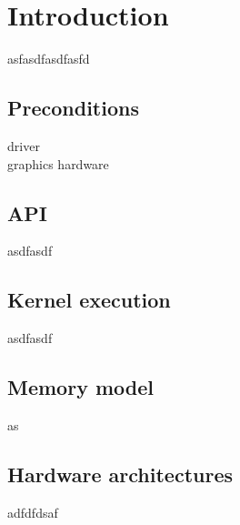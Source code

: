 \section{Introduction}
asfasdfasdfasfd

\subsection{Preconditions}
driver \\
graphics hardware

\subsection{API}
asdfasdf

\subsection{Kernel execution}
asdfasdf

\subsection{Memory model}
as

\subsection{Hardware architectures}

adfdfdsaf